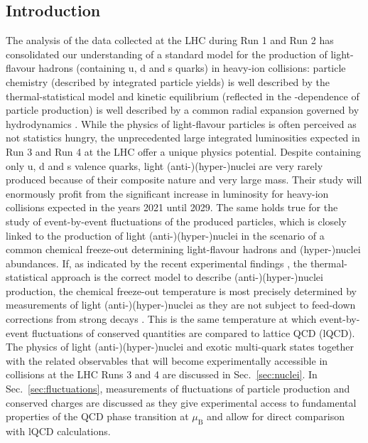 \subsection{Introduction}
The analysis of the data collected at the LHC during Run 1 and Run 2 has consolidated our understanding of a standard model for the production of light-flavour hadrons (containing u, d and s quarks) in heavy-ion collisions:
particle chemistry (described by integrated particle yields) is well described by the thermal-statistical model \cite{Andronic:2017, Acharya:2017bso} and kinetic equilibrium (reflected in the \pT-dependence of particle production) is well described by a common radial expansion governed by hydrodynamics \cite{Abelev:2013vea, Acharya:2018zuq}.
While the physics of light-flavour particles is often perceived as not statistics hungry, the unprecedented large integrated luminosities expected in Run 3 and Run 4 at the LHC offer a unique physics potential. 
Despite containing only u, d and s valence quarks, light \mbox{(anti-)(hyper-)nuclei} are very rarely produced because of their composite nature and very large mass. Their study will enormously profit from the significant increase in luminosity for heavy-ion collisions expected in the years 2021 until 2029.
The same holds true for the study of event-by-event fluctuations of the produced particles, which is closely linked to the production of light \mbox{(anti-)(hyper-)nuclei} in the scenario of a common chemical freeze-out determining light-flavour hadrons and (hyper-)nuclei abundances. 
If, as indicated by the recent experimental findings \cite{Acharya:2017bso}, the thermal-statistical approach is the correct model to describe (anti-)(hyper-)nuclei production, the chemical freeze-out temperature is most precisely determined by measurements of light \mbox{(anti-)(hyper-)nuclei} as they are not subject to feed-down corrections from strong decays \cite{Andronic:2017}. This is the same temperature at which event-by-event fluctuations of conserved quantities are compared to lattice QCD (lQCD).
The physics of light \mbox{(anti-)(hyper-)nuclei} and exotic multi-quark states together with the related observables that will become experimentally accessible in \PbPb collisions at the LHC Runs 3 and 4 are discussed in Sec.~\ref{sec:nuclei}. 
In Sec.~\ref{sec:fluctuations}, measurements of fluctuations of particle production and conserved charges are discussed as they give experimental access to fundamental properties of the QCD phase transition at $\mu_{\mathrm{B}}$ and allow for direct comparison with lQCD calculations. 
